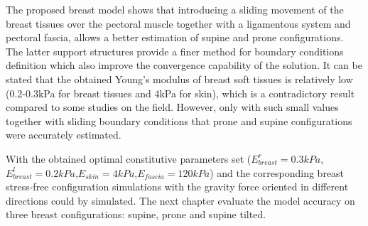 The proposed breast model shows that introducing a sliding movement of the breast tissues over the pectoral muscle together with a ligamentous system and pectoral fascia, allows a better estimation of supine and prone configurations. The latter support structures provide a finer method for boundary conditions definition which also improve the convergence capability of the solution. It can be stated that the obtained Young’s modulus of breast soft tissues is relatively low (0.2-0.3kPa for breast tissues and 4kPa for skin), which is a contradictory result compared to some studies on the field. However, only with such small values together with sliding boundary conditions that prone and supine configurations were accurately estimated.

With the obtained optimal constitutive parameters set  ($E_{breast}^r=0.3 kPa$,$E_{breast}^l=0.2 kPa$,$E_{skin}=4 kPa$,$E_{fascia}=120 kPa$) and the corresponding  breast stress-free configuration simulations with the gravity force oriented in different directions could by simulated. The next chapter evaluate the model accuracy on three breast configurations: supine, prone and supine tilted.
   



